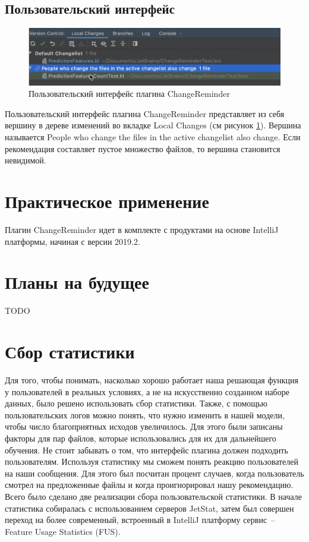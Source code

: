 \documentclass[times]{itmo-student-thesis}
\begin{document}
\subsection{Пользовательский интерфейс}
\begin{figure}[!h]
\caption{Пользовательский интерфейс плагина ChangeReminder}\label{ChangeReminder-ui}
\centering
\includegraphics[scale=0.4]{ChangeReminderUI.png}
\end{figure}
Пользовательский интерфейс плагина ChangeReminder представляет из себя вершину в дереве изменений во вкладке Local Changes (см рисунок \ref{ChangeReminder-ui}). Вершина называется People who change the files in the active changelist also change. Если рекомендация составляет пустое множество файлов, то вершина становится невидимой.
\section{Практическое применение}
Плагин ChangeReminder идет в комплекте с продуктами на основе IntelliJ платформы, начиная с версии 2019.2.
\section{Планы на будущее}
TODO





\section{Сбор статистики}\label{stats-main}
Для того, чтобы понимать, насколько хорошо работает наша решающая функция у пользователей в реальных условиях, а не на искусственно созданном наборе данных, было решено использовать сбор статистики. Также, с помощью пользовательских логов можно понять, что нужно изменить в нашей модели, чтобы число благоприятных исходов увеличилось. Для этого были записаны факторы для пар файлов, которые использовались для их для дальнейшего обучения. Не стоит забывать о том, что интерфейс плагина должен подходить пользователям. Используя статистику мы сможем понять реакцию пользователей на наши сообщения. Для этого был посчитан процент случаев, когда пользователь смотрел на предложенные файлы и когда проигнорировал нашу рекомендацию. Всего было сделано две реализации сбора пользовательской статистики. В начале статистика собиралась с использованием серверов JetStat, затем был совершен переход на более современный, встроенный в IntelliJ платформу сервис~-- Feature Usage Statistics (FUS).
\end{document}
